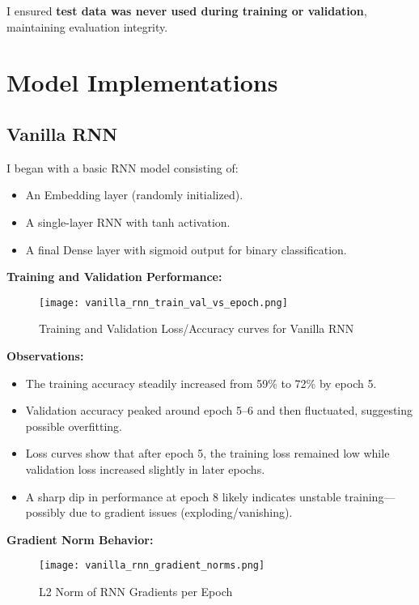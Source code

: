 \documentclass[12pt]{article}
\begin{document}
I ensured \textbf{test data was never used during training or validation}, maintaining evaluation integrity.

\section{Model Implementations}

\subsection{Vanilla RNN}

I began with a basic RNN model consisting of:
\begin{itemize}
    \item An Embedding layer (randomly initialized).
    \item A single-layer RNN with tanh activation.
    \item A final Dense layer with sigmoid output for binary classification.
\end{itemize}

\textbf{Training and Validation Performance:}

\begin{figure}[H]
    \centering
    \texttt{[image: vanilla\_rnn\_train\_val\_vs\_epoch.png]}
    \caption{Training and Validation Loss/Accuracy curves for Vanilla RNN}
\end{figure}

\textbf{Observations:}
\begin{itemize}
    \item The training accuracy steadily increased from 59\% to 72\% by epoch 5.
    \item Validation accuracy peaked around epoch 5–6 and then fluctuated, suggesting possible overfitting.
    \item Loss curves show that after epoch 5, the training loss remained low while validation loss increased slightly in later epochs.
    \item A sharp dip in performance at epoch 8 likely indicates unstable training—possibly due to gradient issues (exploding/vanishing).
    
\end{itemize}

\textbf{Gradient Norm Behavior:}

\begin{figure}[H]
    \centering
    \texttt{[image: vanilla\_rnn\_gradient\_norms.png]}
    \caption{L2 Norm of RNN Gradients per Epoch}
\end{figure}
\end{document}
